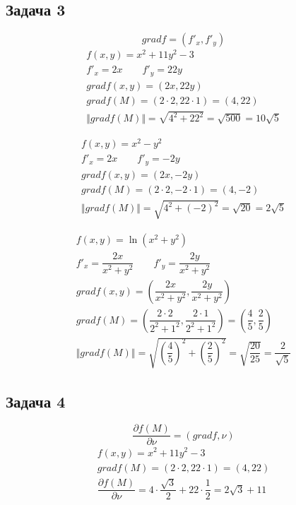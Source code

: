 \documentclass[a4paper,fleqn,12pt]{article}
\theoremstyle{definition}
\begin{document}
\subsection*{Задача 3}
$$ grad f = (f'_x, f'_y)$$
\begin{gather*}
 f(x,y) = x^2 + 11y^2 - 3\\
f'_x = 2x \qquad f'_y = 22y\\ 
gradf(x,y) = (2x, 22y)\\ 
gradf(M) = (2\cdot 2, 22 \cdot 1) = (4,22)\\
\Vert grad f(M)\Vert = \sqrt{4^2 + 22^2} = \sqrt{500} =  10\sqrt{5}
\end{gather*}

\begin{gather*}
f(x,y) = x^2 - y^2\\
f'_x = 2x \qquad f'_y = -2y\\ 
gradf(x,y) = (2x, -2y)\\ 
gradf(M) = (2\cdot 2, -2 \cdot 1) = (4,-2)\\
\Vert grad f(M)\Vert = \sqrt{4^2 + (-2)^2} = \sqrt{20} =  2\sqrt{5}
\end{gather*}

\begin{gather*}
f(x,y) = \ln{(x^2 + y^2)}\\
f'_x = \dfrac{2x}{x^2+y^2} \qquad f'_y = \dfrac{2y}{x^2+y^2}\\ 
gradf(x,y) = \left(\dfrac{2x}{x^2+y^2} , \dfrac{2y}{x^2+y^2} \right)\\ 
gradf(M) = \left(\dfrac{2 \cdot 2}{2^2+1^2}, \dfrac{2 \cdot 1}{2^2+1^2} \right) = \left(\dfrac{4}{5} , \dfrac{2}{5} \right) \\
\Vert grad f(M)\Vert = \sqrt{\left( \dfrac{4}{5} \right) ^2 + \left( \dfrac{2}{5} \right) ^2} = \sqrt{\dfrac{20}{25}} = \dfrac{2}{\sqrt{5}}
\end{gather*}

\subsection*{Задача 4}
$$\dfrac{\partial f(M)}{\partial \nu} = (grad f, \nu)$$
\begin{gather*}
 f(x,y) = x^2 + 11y^2 - 3\\
gradf(M) = (2\cdot 2, 22 \cdot 1) = (4,22)\\
\dfrac{\partial f(M)}{\partial \nu} = 4 \cdot \dfrac{\sqrt{3}}{2} + 22 \cdot \dfrac{1}{2} = 2\sqrt{3} + 11
\end{gather*}
\end{document}
